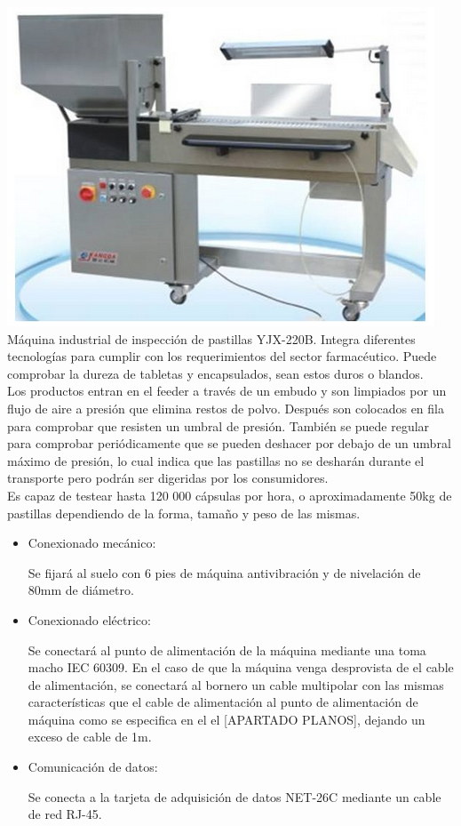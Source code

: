 	\includegraphics[scale=0.6]{Datasheets/3Foto.png}\\
		
	Máquina industrial de inspección de pastillas YJX-220B. Integra diferentes tecnologías para cumplir con los requerimientos del sector farmacéutico. Puede comprobar la dureza de tabletas y encapsulados, sean estos duros o blandos.\\

	Los productos entran en el feeder a través de un embudo y son limpiados por un flujo de aire a presión que elimina restos de polvo. Después son colocados en fila para comprobar que resisten un umbral de presión. También se puede regular para comprobar periódicamente que se pueden deshacer por debajo de un umbral máximo de presión, lo cual indica que las pastillas no se desharán durante el transporte pero podrán ser digeridas por los consumidores.\\


	Es capaz de testear hasta 120 000 cápsulas por hora, o aproximadamente 50kg de pastillas dependiendo de la forma, tamaño y peso de las mismas.\\



		\begin{itemize}
				\item{Conexionado mecánico:}
				
				Se fijará al suelo con 6 pies de máquina antivibración y de nivelación de 80mm de diámetro.

				\item{Conexionado eléctrico:}

				Se conectará al punto de alimentación de la máquina mediante una  toma macho IEC 60309. En el caso de que la máquina venga desprovista de el cable de alimentación, se conectará al bornero un cable multipolar con las mismas características que el cable de alimentación al punto de alimentación de máquina como se especifica en el el [APARTADO PLANOS], dejando un exceso de cable de 1m. \
				
				\item{Comunicación de datos:}

				Se conecta a la tarjeta de adquisición de datos NET-26C mediante un cable de red RJ-45.
		\end{itemize}

